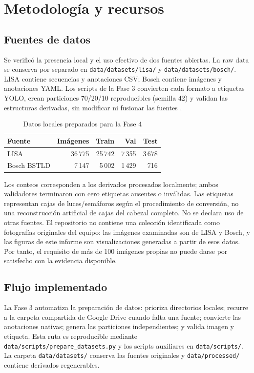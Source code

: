 \documentclass[conference]{IEEEtran}
\begin{document}
\section{Metodología y recursos}
\subsection{Fuentes de datos}
Se verificó la presencia local y el uso efectivo de dos fuentes abiertas. La raw data se conserva por separado en \texttt{data/datasets/lisa/} y \texttt{data/datasets/bosch/}. LISA contiene secuencias y anotaciones CSV; Bosch contiene imágenes y anotaciones YAML. Los scripts de la Fase 3 convierten cada formato a etiquetas YOLO, crean particiones 70/20/10 reproducibles (semilla 42) y validan las estructuras derivadas, sin modificar ni fusionar las fuentes \cite{jensen2016,behrendt2017}.

\begin{table}[t]
\caption{Datos locales preparados para la Fase 4}
\label{tab:datasets}
\centering
\small
\begin{tabular}{lrrrr}
\toprule
Fuente & Imágenes & Train & Val & Test\\
\midrule
LISA & 36\,775 & 25\,742 & 7\,355 & 3\,678\\
Bosch BSTLD & 7\,147 & 5\,002 & 1\,429 & 716\\
\bottomrule
\end{tabular}
\end{table}

Los conteos corresponden a los derivados procesados localmente; ambos validadores terminaron con cero etiquetas ausentes o inválidas. Las etiquetas representan cajas de luces/semáforos según el procedimiento de conversión, no una reconstrucción artificial de cajas del cabezal completo. No se declara uso de otras fuentes. El repositorio no contiene una colección identificada como fotografías originales del equipo: las imágenes examinadas son de LISA y Bosch, y las figuras de este informe son visualizaciones generadas a partir de esos datos. Por tanto, el requisito de más de 100 imágenes propias no puede darse por satisfecho con la evidencia disponible.

\subsection{Flujo implementado}
La Fase 3 automatiza la preparación de datos: prioriza directorios locales; recurre a la carpeta compartida de Google Drive cuando falta una fuente; convierte las anotaciones nativas; genera las particiones independientes; y valida imagen y etiqueta. Esta ruta es reproducible mediante \texttt{data/scripts/prepare\_datasets.py} y los scripts auxiliares en \texttt{data/scripts/}. La carpeta \texttt{data/datasets/} conserva las fuentes originales y \texttt{data/processed/} contiene derivados regenerables.
\end{document}
